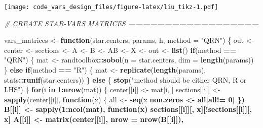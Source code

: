 \documentclass[11pt,]{article}
\newenvironment{Shaded}{\begin{snugshade}}{\end{snugshade}}
\newcommand{\CommentTok}[1]{\textcolor[rgb]{0.56,0.35,0.01}{\textit{#1}}}
\newcommand{\ControlFlowTok}[1]{\textcolor[rgb]{0.13,0.29,0.53}{\textbf{#1}}}
\newcommand{\DataTypeTok}[1]{\textcolor[rgb]{0.13,0.29,0.53}{#1}}
\newcommand{\DecValTok}[1]{\textcolor[rgb]{0.00,0.00,0.81}{#1}}
\newcommand{\KeywordTok}[1]{\textcolor[rgb]{0.13,0.29,0.53}{\textbf{#1}}}
\newcommand{\NormalTok}[1]{#1}
\newcommand{\OperatorTok}[1]{\textcolor[rgb]{0.81,0.36,0.00}{\textbf{#1}}}
\newcommand{\StringTok}[1]{\textcolor[rgb]{0.31,0.60,0.02}{#1}}
\begin{document}
\texttt{[image: code\_vars\_design\_files/figure-latex/liu\_tikz-1.pdf]}

\newpage

\begin{Shaded}
\begin{Highlighting}[]
\CommentTok{# CREATE STAR-VARS MATRICES ------------------------------------------------------}

\NormalTok{vars_matrices <-}\StringTok{ }\ControlFlowTok{function}\NormalTok{(star.centers, params, h, }\DataTypeTok{method =} \StringTok{"QRN"}\NormalTok{) \{}
\NormalTok{  out <-}\StringTok{ }\NormalTok{center <-}\StringTok{ }\NormalTok{sections <-}\StringTok{ }\NormalTok{A <-}\StringTok{ }\NormalTok{B <-}\StringTok{ }\NormalTok{AB <-}\StringTok{ }\NormalTok{X <-}\StringTok{ }\NormalTok{out <-}\StringTok{ }\KeywordTok{list}\NormalTok{()}
  \ControlFlowTok{if}\NormalTok{(method }\OperatorTok{==}\StringTok{ "QRN"}\NormalTok{) \{}
\NormalTok{    mat <-}\StringTok{ }\NormalTok{randtoolbox}\OperatorTok{::}\KeywordTok{sobol}\NormalTok{(}\DataTypeTok{n =}\NormalTok{ star.centers, }\DataTypeTok{dim =} \KeywordTok{length}\NormalTok{(params))}
\NormalTok{  \} }\ControlFlowTok{else} \ControlFlowTok{if}\NormalTok{(method }\OperatorTok{==}\StringTok{ "R"}\NormalTok{) \{}
\NormalTok{    mat <-}\StringTok{ }\KeywordTok{replicate}\NormalTok{(}\KeywordTok{length}\NormalTok{(params), stats}\OperatorTok{::}\KeywordTok{runif}\NormalTok{(star.centers))}
\NormalTok{  \} }\ControlFlowTok{else}\NormalTok{ \{}
    \KeywordTok{stop}\NormalTok{(}\StringTok{"method should be either QRN, R or LHS"}\NormalTok{)}
\NormalTok{  \}}
  \ControlFlowTok{for}\NormalTok{(i }\ControlFlowTok{in} \DecValTok{1}\OperatorTok{:}\KeywordTok{nrow}\NormalTok{(mat)) \{}
\NormalTok{    center[[i]] <-}\StringTok{ }\NormalTok{mat[i, ]}
\NormalTok{    sections[[i]] <-}\StringTok{ }\KeywordTok{sapply}\NormalTok{(center[[i]], }\ControlFlowTok{function}\NormalTok{(x) \{}
\NormalTok{      all <-}\StringTok{ }\KeywordTok{seq}\NormalTok{(x }\OperatorTok{%%}\StringTok{ }\NormalTok{h, }\DecValTok{1}\NormalTok{, h)}
\NormalTok{      non.zeros <-}\StringTok{ }\NormalTok{all[all}\OperatorTok{!=}\StringTok{ }\DecValTok{0}\NormalTok{]}
\NormalTok{    \})}
\NormalTok{    B[[i]] <-}\StringTok{ }\KeywordTok{sapply}\NormalTok{(}\DecValTok{1}\OperatorTok{:}\KeywordTok{ncol}\NormalTok{(mat), }\ControlFlowTok{function}\NormalTok{(x) }
\NormalTok{      sections[[i]][, x][}\OperatorTok{!}\NormalTok{sections[[i]][, x] }\OperatorTok{%in%}\StringTok{ }\NormalTok{center[[i]][x]])}
\NormalTok{    A[[i]] <-}\StringTok{ }\KeywordTok{matrix}\NormalTok{(center[[i]], }\DataTypeTok{nrow =} \KeywordTok{nrow}\NormalTok{(B[[i]]), }
}}
\end{Highlighting}
\end{Shaded}
\end{document}
